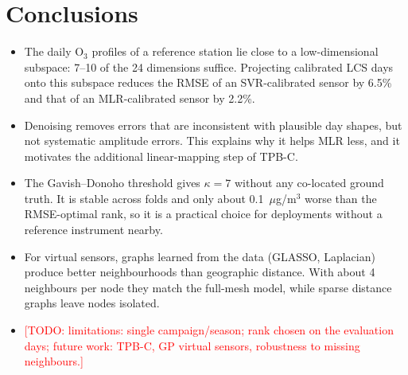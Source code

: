 \documentclass[11pt,a4paper]{article}
\newcommand{\todo}[1]{\textcolor{red}{[TODO: #1]}}
\newcommand{\Othree}{O$_3$}
\newcommand{\ugm}{$\mu$g/m$^3$}
\begin{document}
\section{Conclusions}\label{sec:conclusions}
\begin{itemize}
  \item The daily \Othree{} profiles of a reference station lie close to a low-dimensional subspace: 7--10 of the 24 dimensions suffice. Projecting calibrated LCS days onto this subspace reduces the RMSE of an SVR-calibrated sensor by 6.5\% and that of an MLR-calibrated sensor by 2.2\%.
  \item Denoising removes errors that are inconsistent with plausible day shapes, but not systematic amplitude errors. This explains why it helps MLR less, and it motivates the additional linear-mapping step of TPB-C.
  \item The Gavish--Donoho threshold gives $\kappa=7$ without any co-located ground truth. It is stable across folds and only about 0.1~\ugm{} worse than the RMSE-optimal rank, so it is a practical choice for deployments without a reference instrument nearby.
  \item For virtual sensors, graphs learned from the data (GLASSO, Laplacian) produce better neighbourhoods than geographic distance. With about 4 neighbours per node they match the full-mesh model, while sparse distance graphs leave nodes isolated.
  \item \todo{limitations: single campaign/season; rank chosen on the evaluation days; future work: TPB-C, GP virtual sensors, robustness to missing neighbours.}
\end{itemize}
\end{document}
